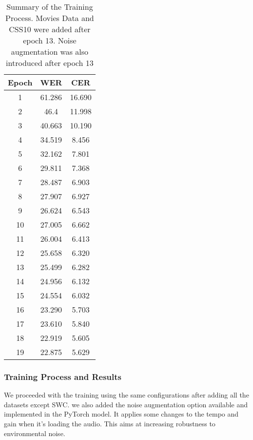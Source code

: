 \begin{table}[!ht]
\centering
\begin{tabular}{|c|c|c|}
	\hline
	Epoch & WER    & CER    \\ \hline
	1     & 61.286 & 16.690 \\ \hline
	2     & 46.4 & 11.998 \\ \hline
	3     & 40.663 & 10.190 \\ \hline
	4     & 34.519 & 8.456  \\ \hline
	5     & 32.162 & 7.801  \\ \hline
	6     & 29.811 & 7.368  \\ \hline
	7     & 28.487 & 6.903  \\ \hline
	8     & 27.907 & 6.927  \\ \hline
	9     & 26.624 & 6.543  \\ \hline
	10    & 27.005 & 6.662  \\ \hline
	11    & 26.004 & 6.413  \\ \hline
	12    & 25.658 & 6.320  \\ \hline
	13    & 25.499 & 6.282  \\ \hline
	14    & 24.956 & 6.132  \\ \hline
	15    & 24.554 & 6.032  \\ \hline
	16    & 23.290 & 5.703  \\ \hline
	17    & 23.610 & 5.840  \\ \hline
	18    & 22.919 & 5.605  \\ \hline
	19    & 22.875 & 5.629  \\ \hline
\end{tabular}
\caption{Summary of the Training Process. Movies Data and CSS10 were added after epoch 13. Noise augmentation was also introduced after epoch 13}
\label{meth:table4}
\end{table}




\subsubsection{Training Process and Results}
\label{meth:s4_sub4_subsub3}

We proceeded with the training using the same configurations after adding all the datasets except \ac{SWC}. we also added the noise augmentation option available and implemented in the PyTorch model. It applies some changes to the tempo and gain when it's loading the audio. This aims at increasing robustness to environmental noise.


